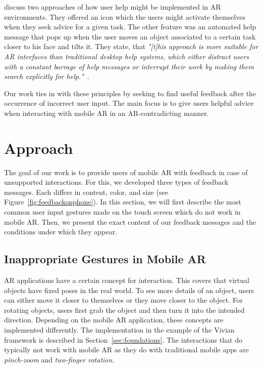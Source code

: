 \documentclass[manuscript]{acmart}
\begin{document}
		\citeauthor{Poupyrev2002} discuss two approaches of how user help might be implemented in \ac{AR} environments. They offered  an icon which the users might activate themselves when they seek advice for a given task. The other feature was an automated help message that pops up when the user moves an object associated to a certain task closer to his face and tilts it. They state, that \textit{"\textnormal{[t]}his approach is more suitable for AR interfaces than traditional desktop help systems, which either distract users with a constant barrage of help messages or interrupt their work by making them search explicitly for help."}~\cite{Poupyrev2002}.
		
		Our work ties in with these principles by seeking to find useful feedback after the occurrence of incorrect user input. The main focus is to give users helpful advice when interacting with mobile AR in an AR-contradicting manner.

	\section{Approach}\label{sec:approach}
		The goal of our work is to provide users of mobile \ac{AR} with feedback in case of unsupported interactions. For this, we developed three types of feedback messages. Each differs in content, color, and size (see Figure~\ref{fig:feedbackonphone}). In this section, we will first describe the most common user input gestures made on the touch screen which do not work in mobile \ac{AR}. Then, we present the exact content of our feedback messages and the conditions under which they appear.

		\subsection{Inappropriate Gestures in Mobile AR}\label{ssec:incorrectinput}
		\ac{AR} applications have a certain concept for interaction. This covers that virtual objects have fixed poses in the real world. To see more details of an object, users can either move it closer to themselves or they move closer to the object. For rotating objects, users first grab the object and then turn it into the intended direction.
		Depending on the mobile \ac{AR} application, these concepts are implemented differently. The implementation in the example of the Vivian framework is described in Section~\ref{sec:foundations}. The interactions that do typically not work with mobile \ac{AR} as they do with traditional mobile apps are \emph{pinch-zoom} and \emph{two-finger rotation}.
\end{document}
